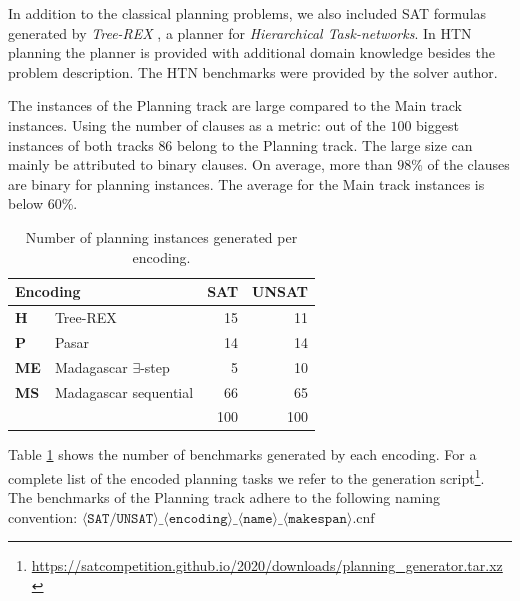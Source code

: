 \documentclass{elsarticle}
\begin{document}
In addition to the classical planning problems, we also included SAT formulas
generated by \emph{Tree-REX} \cite{TreeRex19}, a planner for \emph{Hierarchical
	Task-networks}. In HTN planning the planner is provided with additional domain
knowledge besides the problem description. The HTN benchmarks were provided by
the solver author.

The instances of the Planning track are large compared to the Main track
instances. Using the number of clauses as a metric: out of the $100$ biggest
instances of both tracks
$86$ belong to the Planning track. The large size can mainly be attributed to
binary clauses. On average, more than $98$\% of the clauses are binary for
planning instances. The average for the Main track instances is below $60$\%.

\begin{table}[t]
	\centering\small
	\begin{tabular}{llrr}
		\multicolumn{2}{l}{Encoding} & SAT                       & UNSAT       \\
		\hline\arrayrulecolor{lightgray}
		\textbf{H}                   & Tree-REX                  & 15    & 11  \\
		\textbf{P}                   & Pasar                     & 14    & 14  \\
		\textbf{ME}                  & Madagascar $\exists$-step & 5     & 10  \\
		\textbf{MS}                  & Madagascar sequential     & 66    & 65  \\
		\hline
		                             &                           & 100   & 100 \\
	\end{tabular}
	\label{tab:planningBenchmarkDist}
	\caption{Number of planning instances generated per encoding.}
\end{table}

Table \ref{tab:planningBenchmarkDist} shows the number of benchmarks generated
by each encoding.
For a complete list of the encoded planning tasks we refer to the
generation script\footnote{\url{https://satcompetition.github.io/2020/downloads/planning_generator.tar.xz}}.
The benchmarks of the Planning track adhere to the following naming convention:
${\langle \texttt{SAT/UNSAT} \rangle\_\langle \texttt{encoding} \rangle\_\langle
			\texttt{name} \rangle\_\langle \texttt{makespan}
			\rangle\text{.cnf}}$
\end{document}
